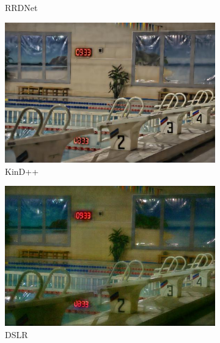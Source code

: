 \documentclass[a4paper]{ctexart}
\begin{document}
\begin{figure}[htb]
\begin{subfigure}{0.19\textwidth}
				\captionsetup{font=scriptsize}
				\caption{RRDNet}
				\label{fig: RRDNet}
			\end{subfigure}
			\begin{subfigure}{0.19\textwidth}
				\includegraphics[width=\linewidth]{picture/LLIE/Experiment/KinD++}
				\captionsetup{font=scriptsize}
				\caption{KinD++}
				\label{fig: KinD++}	
			\end{subfigure}
			\begin{subfigure}{0.19\textwidth}
				\includegraphics[width=\linewidth]{picture/LLIE/Experiment/DSLR}
				\captionsetup{font=scriptsize}
				\caption{DSLR}
				\label{fig: DSLR}	
			\end{subfigure}\\
			\begin{subfigure}{0.19\textwidth}

\end{subfigure}
\end{figure}
\end{document}
